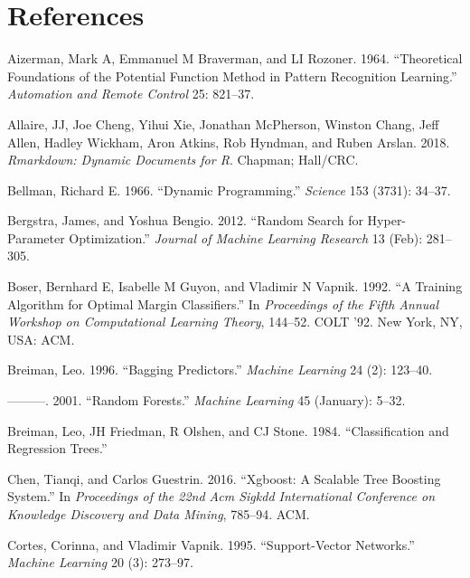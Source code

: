 \documentclass[
  11pt,
  a4paper,
  DIV=12,captions=tableheading,oneside,titlepage]{scrbook}
\begin{document}
\hypertarget{references}{%
\chapter*{References}\label{references}}

\hypertarget{refs}{}
\leavevmode\hypertarget{ref-aizerman1964theoretical}{}%
Aizerman, Mark A, Emmanuel M Braverman, and LI Rozoner. 1964. ``Theoretical Foundations of the Potential Function Method in Pattern Recognition Learning.'' \emph{Automation and Remote Control} 25: 821--37.

\leavevmode\hypertarget{ref-allaire2016rmarkdown}{}%
Allaire, JJ, Joe Cheng, Yihui Xie, Jonathan McPherson, Winston Chang, Jeff Allen, Hadley Wickham, Aron Atkins, Rob Hyndman, and Ruben Arslan. 2018. \emph{Rmarkdown: Dynamic Documents for R}. Chapman; Hall/CRC.

\leavevmode\hypertarget{ref-bellman1966dynamic}{}%
Bellman, Richard E. 1966. ``Dynamic Programming.'' \emph{Science} 153 (3731): 34--37.

\leavevmode\hypertarget{ref-bergstra2012random}{}%
Bergstra, James, and Yoshua Bengio. 2012. ``Random Search for Hyper-Parameter Optimization.'' \emph{Journal of Machine Learning Research} 13 (Feb): 281--305.

\leavevmode\hypertarget{ref-boser1992svc}{}%
Boser, Bernhard E, Isabelle M Guyon, and Vladimir N Vapnik. 1992. ``A Training Algorithm for Optimal Margin Classifiers.'' In \emph{Proceedings of the Fifth Annual Workshop on Computational Learning Theory}, 144--52. COLT '92. New York, NY, USA: ACM.

\leavevmode\hypertarget{ref-breiman1996bagging}{}%
Breiman, Leo. 1996. ``Bagging Predictors.'' \emph{Machine Learning} 24 (2): 123--40.

\leavevmode\hypertarget{ref-breiman2001rf}{}%
---------. 2001. ``Random Forests.'' \emph{Machine Learning} 45 (January): 5--32.

\leavevmode\hypertarget{ref-breiman1984classification}{}%
Breiman, Leo, JH Friedman, R Olshen, and CJ Stone. 1984. ``Classification and Regression Trees.''

\leavevmode\hypertarget{ref-chen2016xgboost}{}%
Chen, Tianqi, and Carlos Guestrin. 2016. ``Xgboost: A Scalable Tree Boosting System.'' In \emph{Proceedings of the 22nd Acm Sigkdd International Conference on Knowledge Discovery and Data Mining}, 785--94. ACM.

\leavevmode\hypertarget{ref-cortes1995support}{}%
Cortes, Corinna, and Vladimir Vapnik. 1995. ``Support-Vector Networks.'' \emph{Machine Learning} 20 (3): 273--97.
\end{document}
